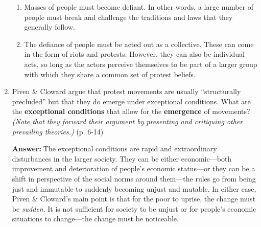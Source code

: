 \documentclass{article}
\newcommand{\answer}{\textbf{Answer:}$\;$}
\begin{document}
\begin{enumerate}[label=\arabic*)]
    \begin{enumerate}
        \item Masses of people must become defiant. 
        In other words, a large number of people must break and challenge the traditions and laws that they generally follow.
        \item The defiance of people must be acted out as a collective.
        These can come in the form of riots and protests.
        However, they can also be individual acts, so long as the actors perceive themselves to be part of a larger group with which they share a common set of protest beliefs.
    \end{enumerate}

    \item Piven \& Cloward argue that protest movements are usually ``structurally precluded'' but that they do emerge under exceptional conditions.
    What are the \textbf{exceptional conditions} that allow for the \textbf{emergence} of movements?
    \textit{(Note that they forward their argument by presenting and critiquing other prevailing theories.)} (p. 6-14) 

    \answer The exceptional conditions are rapid and extraordinary disturbances in the larger society.
    They can be either economic---both improvement and deterioration of people's economic status---or they can be a shift in perspective of the social norms around them---the rules go from being just and immutable to suddenly becoming unjust and mutable.
    In either case, Piven \& Cloward's main point is that for the poor to uprise, the change must be \textit{sudden}.
    It is not sufficient for society to be unjust or for people's economic situations to change---the change must be noticeable.
    
\end{enumerate}
 
\end{document}

